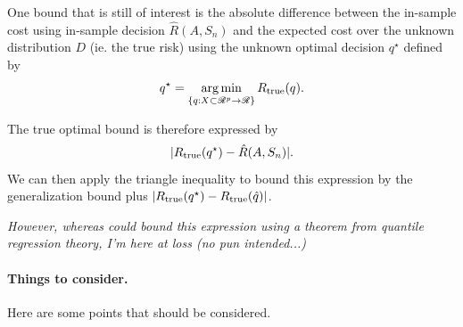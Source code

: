 One bound that is still of interest is the absolute difference between the in-sample cost
using in-sample decision $\hat R(A,S_n)$ and the expected cost over the unknown
distribution $D$ (ie. the true risk) using the unknown optimal decision $q^\star$ defined
by
\begin{equation*}
  q^\star = \operatorname*{arg\,min}_{\{q:X\subset\mathscr{R}^p\to\mathscr{R}\}}R_{\mathrm{true}}(q).
\end{equation*}

The true optimal bound is therefore expressed by
\begin{equation*}
|R_{\mathrm{true}}(q^\star) - \hat R(A,S_n)|.  
\end{equation*}
We can then apply the triangle inequality to bound this expression by the generalization
bound plus $|R_{\mathrm{true}}(q^\star) - R_{\mathrm{true}}(\hat q)|$. 

\textit{However, whereas \cite{rudin2015} could bound this expression using a theorem from
  quantile regression theory, I'm here at loss (no pun intended...)}





\paragraph{Things to consider.}

Here are some points that should be considered.

